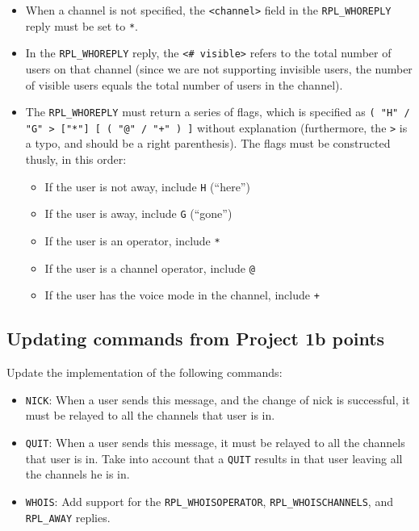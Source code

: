 \documentclass[10pt]{article}
\newcommand{\points}[1]{{\sffamily\mdseries\guillemotleft #1 points\guillemotright{}}}
\begin{document}
\begin{itemize}
\item When a channel is not specified, the \texttt{<channel>} field in the \texttt{RPL\_WHOREPLY} reply must be set to \texttt{*}.
\item In the \texttt{RPL\_WHOREPLY} reply, the \texttt{<\# visible>} refers to the total number of users on that channel (since we are not supporting invisible users, the number of visible users equals the total number of users in the channel).
\item The \texttt{RPL\_WHOREPLY} must return a series of flags, which is specified as \verb|( "H" / "G" > ["*"] [ ( "@" / "+" ) ]| without explanation (furthermore, the \texttt{>} is a typo, and should be a right parenthesis). The flags must be constructed thusly, in this order:
\begin{itemize}
\item If the user is not away, include \texttt{H} (``here'')
\item If the user is away, include \texttt{G} (``gone'')
\item If the user is an operator, include \texttt{*}
\item If the user is a channel operator, include \texttt{@}
\item If the user has the voice mode in the channel, include \texttt{+}
\end{itemize}
\end{itemize}

\subsection{Updating commands from Project 1b \points{5}}

Update the implementation of the following commands:

\begin{itemize}
\item \texttt{NICK}: When a user sends this message, and the change of nick is successful, it must be relayed to all the channels that user is in.
\item \texttt{QUIT}: When a user sends this message, it must be relayed to all the channels that user is in. Take into account that a \texttt{QUIT} results in that user leaving all the channels he is in.
\item \texttt{WHOIS}: Add support for the \texttt{RPL\_WHOISOPERATOR}, \texttt{RPL\_WHOISCHANNELS}, and \texttt{RPL\_AWAY} replies.
\end{itemize}
\end{document}
